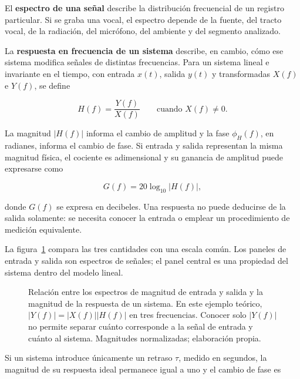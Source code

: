 El \textbf{espectro de una señal} describe la distribución frecuencial de un
registro particular. Si se graba una vocal, el espectro depende de la fuente,
del tracto vocal, de la radiación, del micrófono, del ambiente y del segmento
analizado.

La \textbf{respuesta en frecuencia de un sistema} describe, en cambio, cómo
ese sistema modifica señales de distintas frecuencias. Para un sistema lineal
e invariante en el tiempo, con entrada \(x(t)\), salida \(y(t)\) y
transformadas \(X(f)\) e \(Y(f)\), se define

\begin{equation}
    H(f)=\frac{Y(f)}{X(f)}
    \qquad\text{cuando }X(f)\neq0.
    \label{eq:u5-respuesta-frecuencia}
\end{equation}

La magnitud \(\lvert H(f)\rvert\) informa el cambio de amplitud y la fase
\(\phi_H(f)\), en radianes, informa el cambio de fase. Si entrada y salida
representan la misma magnitud física, el cociente es adimensional y su
ganancia de amplitud puede expresarse como

\begin{equation}
    G(f)=20\log_{10}\lvert H(f)\rvert,
    \label{eq:u5-ganancia-respuesta}
\end{equation}

donde \(G(f)\) se expresa en decibeles. Una respuesta no puede deducirse de la
salida solamente: se necesita conocer la entrada o emplear un procedimiento
de medición equivalente.

La figura~\ref{fig:u5-espectro-respuesta-sistema} compara las tres cantidades
con una escala común. Los paneles de entrada y salida son espectros de señales;
el panel central es una propiedad del sistema dentro del modelo lineal.

\begin{figure}[htbp]
    \centering
    
    \caption{Relación entre los espectros de magnitud de entrada y salida y la
    magnitud de la respuesta de un sistema. En este ejemplo teórico,
    \(\lvert Y(f)\rvert=\lvert X(f)\rvert\lvert H(f)\rvert\) en tres
    frecuencias. Conocer solo \(\lvert Y(f)\rvert\) no permite separar cuánto
    corresponde a la señal de entrada y cuánto al sistema. Magnitudes
    normalizadas; elaboración propia.}
    \label{fig:u5-espectro-respuesta-sistema}
\end{figure}

Si un sistema introduce únicamente un retraso \(\tau\), medido en segundos,
la magnitud de su respuesta ideal permanece igual a uno y el cambio de fase es

